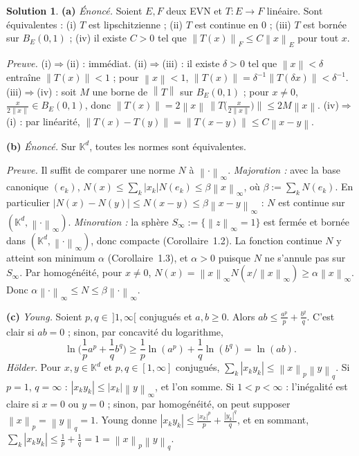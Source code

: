 \documentclass[11pt,a4paper]{article}
\newcommand{\K}{\mathbb{K}}
\newcommand{\norm}[1]{\left\|#1\right\|}
\theoremstyle{definition}
\newtheorem*{solution}{Solution}
\begin{document}
\begin{solution}
\noindent\textbf{(a)} \emph{Énoncé.} Soient $E,F$ deux EVN et $T:E\to F$ linéaire. Sont équivalentes : (i) $T$ est lipschitzienne ; (ii) $T$ est continue en $0$ ; (iii) $T$ est bornée sur $B_E(0,1)$ ; (iv) il existe $C>0$ tel que $\norm{T(x)}_F\le C\norm x_E$ pour tout $x$.

\emph{Preuve.} (i)$\Rightarrow$(ii) : immédiat. (ii)$\Rightarrow$(iii) : il existe $\delta>0$ tel que $\norm x<\delta$ entraîne $\norm{T(x)}<1$ ; pour $\norm x<1$, $\norm{T(x)}=\delta^{-1}\norm{T(\delta x)}<\delta^{-1}$. (iii)$\Rightarrow$(iv) : soit $M$ une borne de $\norm{T}$ sur $B_E(0,1)$ ; pour $x\ne0$, $\frac x{2\norm x}\in B_E(0,1)$, donc $\norm{T(x)}=2\norm x\,\big\|T\big(\frac x{2\norm x}\big)\big\|\le2M\norm x$. (iv)$\Rightarrow$(i) : par linéarité, $\norm{T(x)-T(y)}=\norm{T(x-y)}\le C\norm{x-y}$.

\medskip
\noindent\textbf{(b)} \emph{Énoncé.} Sur $\K^d$, toutes les normes sont équivalentes.

\emph{Preuve.} Il suffit de comparer une norme $N$ à $\norm\cdot_\infty$. \emph{Majoration :} avec la base canonique $(e_k)$, $N(x)\le\sum_k|x_k|N(e_k)\le\beta\norm x_\infty$, où $\beta:=\sum_kN(e_k)$. En particulier $|N(x)-N(y)|\le N(x-y)\le\beta\norm{x-y}_\infty$ : $N$ est continue sur $(\K^d,\norm\cdot_\infty)$. \emph{Minoration :} la sphère $S_\infty:=\{\norm z_\infty=1\}$ est fermée et bornée dans $(\K^d,\norm\cdot_\infty)$, donc compacte (Corollaire~1.2). La fonction continue $N$ y atteint son minimum $\alpha$ (Corollaire~1.3), et $\alpha>0$ puisque $N$ ne s'annule pas sur $S_\infty$. Par homogénéité, pour $x\ne0$, $N(x)=\norm x_\infty N(x/\norm x_\infty)\ge\alpha\norm x_\infty$. Donc $\alpha\norm\cdot_\infty\le N\le\beta\norm\cdot_\infty$.

\medskip
\noindent\textbf{(c)} \emph{Young.} Soient $p,q\in\,]1,\infty[$ conjugués et $a,b\ge0$. Alors $ab\le\frac{a^p}p+\frac{b^q}q$. C'est clair si $ab=0$ ; sinon, par concavité du logarithme,
\[
\ln\Big(\frac1pa^p+\frac1qb^q\Big)\ge\frac1p\ln(a^p)+\frac1q\ln(b^q)=\ln(ab) .
\]
\emph{Hölder.} Pour $x,y\in\K^d$ et $p,q\in[1,\infty]$ conjugués, $\sum_k|x_ky_k|\le\norm x_p\norm y_q$. Si $p=1$, $q=\infty$ : $|x_ky_k|\le|x_k|\norm y_\infty$, et l'on somme. Si $1<p<\infty$ : l'inégalité est claire si $x=0$ ou $y=0$ ; sinon, par homogénéité, on peut supposer $\norm x_p=\norm y_q=1$. Young donne $|x_ky_k|\le\frac{|x_k|^p}p+\frac{|y_k|^q}q$, et en sommant, $\sum_k|x_ky_k|\le\frac1p+\frac1q=1=\norm x_p\norm y_q$.


\end{solution}
\end{document}
